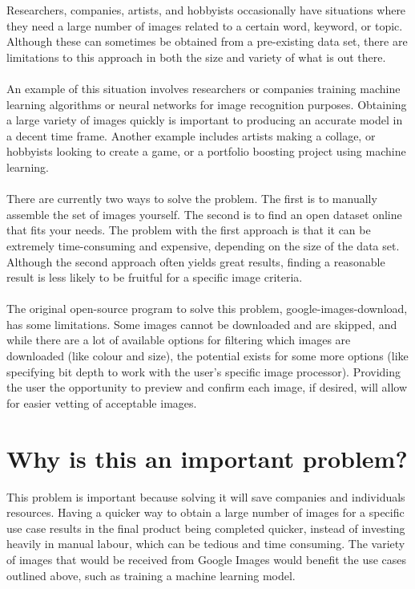 \documentclass{article}
\begin{document}
Researchers, companies, artists, and hobbyists occasionally have situations where they need a large number of images related to a certain word, keyword, or topic. Although these can sometimes be obtained from a pre-existing data set, there are limitations to this approach in both the size and variety of what is out there.
\\\\An example of this situation involves researchers or companies training machine learning algorithms or neural networks for image recognition purposes. Obtaining a large variety of images quickly is important to producing an accurate model in a decent time frame. Another example includes artists making a collage, or hobbyists looking to create a game, or a portfolio boosting project using machine learning.
\\\\There are currently two ways to solve the problem. The first is to manually assemble the set of images yourself. The second is to find an open dataset online that fits your needs. The problem with the first approach is that it can be extremely time-consuming and expensive, depending on the size of the data set. Although the second approach often yields great results, finding a reasonable result is less likely to be fruitful for a specific image criteria.
\\\\The original open-source program to solve this problem, google-images-download, has some limitations. Some images cannot be downloaded and are skipped, and while there are a lot of available options for filtering which images are downloaded (like colour and size), the potential exists for some more options (like specifying bit depth to work with the user’s specific image processor). Providing the user the opportunity to preview and confirm each image, if desired, will allow for easier vetting of acceptable images.


\section* {Why is this an important problem?}

This problem is important because solving it will save companies and individuals resources. Having a quicker way to obtain a large number of images for a specific use case results in the final product being completed quicker, instead of investing heavily in manual labour, which can be tedious and time consuming. The variety of images that would be received from Google Images would benefit the use cases outlined above, such as training a machine learning model.
\end{document}
